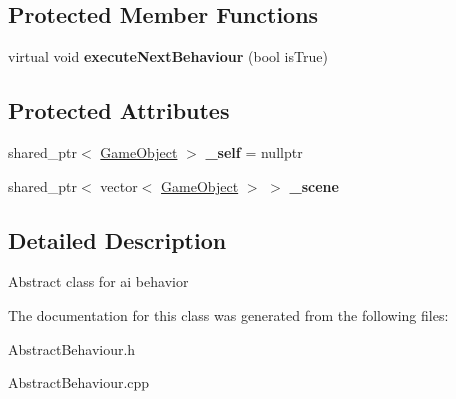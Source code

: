 \subsection*{Protected Member Functions}
\begin{DoxyCompactItemize}
\item 
\mbox{\label{class_abstract_behaviour_a931021cf02c0a2dd40fac4a86d1d5d25}} 
virtual void {\bfseries execute\+Next\+Behaviour} (bool is\+True)
\end{DoxyCompactItemize}
\subsection*{Protected Attributes}
\begin{DoxyCompactItemize}
\item 
\mbox{\label{class_abstract_behaviour_a4e825e734fdfe11ee2d030f909765845}} 
shared\+\_\+ptr$<$ \mbox{\hyperlink{class_game_object}{Game\+Object}} $>$ {\bfseries \+\_\+self} = nullptr
\item 
\mbox{\label{class_abstract_behaviour_a4c97685f487ce0f429276df8d003b70e}} 
shared\+\_\+ptr$<$ vector$<$ \mbox{\hyperlink{class_game_object}{Game\+Object}} $>$ $>$ {\bfseries \+\_\+scene}
\end{DoxyCompactItemize}


\subsection{Detailed Description}
Abstract class for ai behavior 



The documentation for this class was generated from the following files\+:\begin{DoxyCompactItemize}
\item 
Abstract\+Behaviour.\+h\item 
Abstract\+Behaviour.\+cpp\end{DoxyCompactItemize}
